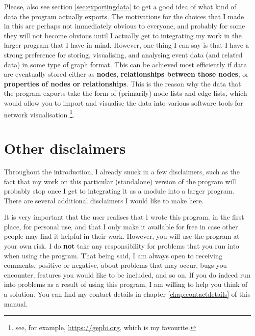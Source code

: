 \documentclass{memoir}
\begin{document}
Please, also see section \ref{sec:exportingdata} to get a good idea of what kind of data the program actually exports. The motivations for the choices that I made in this are perhaps not immediately obvious to everyone, and probably for some they will not become obvious until I actually get to integrating my work in the larger program that I have in mind. However, one thing I can say is that I have a strong preference for storing, visualising, and analysing event data (and related data) in some type of graph format. This can be achieved most efficiently if data are eventually stored either as \textbf{nodes}, \textbf{relationships between those nodes}, or \textbf{properties of nodes or relationships}. This is the reason why the data that the program exports take the form of (primarily) node lists and edge lists, which would allow you to import and visualise the data into various software tools for network visualisation \footnote{see, for example, \url{https://gephi.org}, which is my favourite.}.  

\section{Other disclaimers}
\label{sec:disclaimers}

Throughout the introduction, I already snuck in a few disclaimers, such as the fact that my work on this particular (standalone) version of the program will probably stop once I get to integrating it as a module into a larger program. There are several additional disclaimers I would like to make here. 

It is very important that the user realises that I wrote this program, in the first place, for personal use, and that I only make it available for free in case other people may find it helpful in their work. However, you will use the program at your own risk. I do \textbf{not} take any responsibility for problems that you run into when using the program. That being said, I am always open to receiving comments, positive or negative, about problems that may occur, bugs you encounter, features you would like to be included, and so on. If you do indeed run into problems as a result of using this program, I am willing to help you think of a solution. You can find my contact details in chapter \ref{chap:contactdetails} of this manual.
\end{document}
